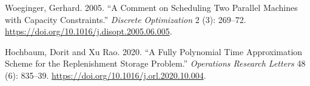\documentclass[11pt]{article} %
\theoremstyle{definition}
\begin{document}
%
%
%
%
%
%
%
%
%
%
Woeginger, Gerhard. 2005. ``A Comment on Scheduling Two Parallel Machines with Capacity Constraints.'' \emph{Discrete Optimization} 2 (3): 269--72. \url{https://doi.org/10.1016/j.disopt.2005.06.005}. 

%
Hochbaum, Dorit and Xu Rao. 2020. ``A Fully Polynomial Time Approximation Scheme for the Replenishment Storage Problem.'' \emph{Operations Research Letters} 48 (6): 835--39. \url{https://doi.org/10.1016/j.orl.2020.10.004}.
\end{document}
